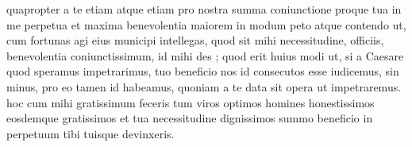  quapropter a te etiam atque etiam pro nostra summa coniunctione proque tua in me perpetua et maxima benevolentia maiorem in modum peto atque contendo ut, cum fortunas agi eius municipi intellegas, quod sit mihi necessitudine, officiis, benevolentia coniunctissimum, id mihi des ; quod erit huius modi ut, si a Caesare quod speramus impetrarimus, tuo beneficio nos id consecutos esse iudicemus, sin minus, pro eo tamen id habeamus, quoniam a te data sit opera ut impetraremus. hoc cum mihi gratissimum feceris tum viros optimos homines honestissimos eosdemque gratissimos et tua necessitudine dignissimos summo beneficio in perpetuum tibi tuisque devinxeris.

